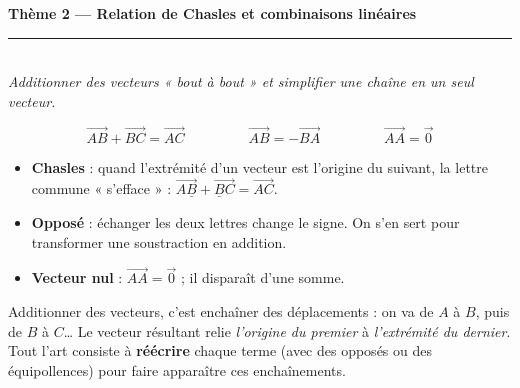 \documentclass[11pt,a4paper]{article}
\newcommand{\vc}[1]{\overrightarrow{#1}}
\begin{document}
\begin{center}
{\LARGE\bfseries\color{primarydark}Thème 2 — Relation de Chasles et combinaisons linéaires}\\[2pt]
{\color{primary}\rule{0.7\linewidth}{1.2pt}}\\[4pt]
{\small\itshape Additionner des vecteurs « bout à bout » et simplifier une chaîne en un seul vecteur.}
\end{center}
\vspace{1mm}

\begin{rappel}
\[
  \boxed{\;\vc{AB}+\vc{BC}=\vc{AC}\;}\qquad\qquad
  \boxed{\;\vc{AB}=-\vc{BA}\;}\qquad\qquad
  \boxed{\;\vc{AA}=\vec 0\;}
\]
\begin{itemize}[leftmargin=1.5em,topsep=2pt,itemsep=1pt]
  \item \textbf{Chasles} : quand l'extrémité d'un vecteur est l'origine du suivant, la lettre commune
        « s'efface » : $\vc{A\underline{B}}+\vc{\underline{B}C}=\vc{AC}$.
  \item \textbf{Opposé} : échanger les deux lettres change le signe. On s'en sert pour transformer
        une soustraction en addition.
  \item \textbf{Vecteur nul} : $\vc{AA}=\vec0$ ; il disparaît d'une somme.
\end{itemize}
\end{rappel}

\begin{idee}
Additionner des vecteurs, c'est enchaîner des déplacements : on va de $A$ à $B$, puis de $B$ à $C$…
Le vecteur résultant relie \emph{l'origine du premier} à \emph{l'extrémité du dernier}. Tout l'art
consiste à \textbf{réécrire} chaque terme (avec des opposés ou des équipollences) pour faire apparaître
ces enchaînements.
\end{idee}

\begin{center}
\end{center}
\end{document}
